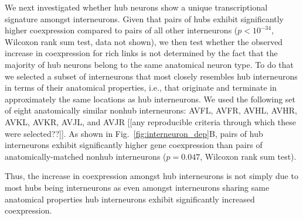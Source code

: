 \documentclass[10pt,letterpaper]{article}
\begin{document}
We next investigated whether hub neurons show a unique transcriptional signature amongst interneurons.
Given that pairs of hubs exhibit significantly higher coexpression compared to pairs of all other interneurons ($p < 10^{-34}$, Wilcoxon rank sum test, data not shown), we then test whether the observed increase in coexpression for rich links is not determined by the fact that the majority of hub neurons belong to the same anatomical neuron type.
To do that we selected a subset of interneurons that most closely resembles hub interneurons in terms of their anatomical properties, i.e., that originate and terminate in approximately the same locations as hub interneurons.
We used the following set of eight anatomically similar nonhub interneurons: AVFL, AVFR, AVHL, AVHR, AVKL, AVKR, AVJL, and AVJR [[any reproducible criteria through which these were selected??]].
As shown in Fig.~\ref{fig:interneuron_dep}B, pairs of hub interneurons exhibit significantly higher gene coexpression than pairs of anatomically-matched nonhub interneurons ($p = 0.047$, Wilcoxon rank sum test).

Thus, the increase in coexpression amongst hub interneurons is not simply due to most hubs being interneurons as even amongst interneurons sharing same anatomical properties hub interneurons exhibit significantly increased coexpression.
\end{document}
